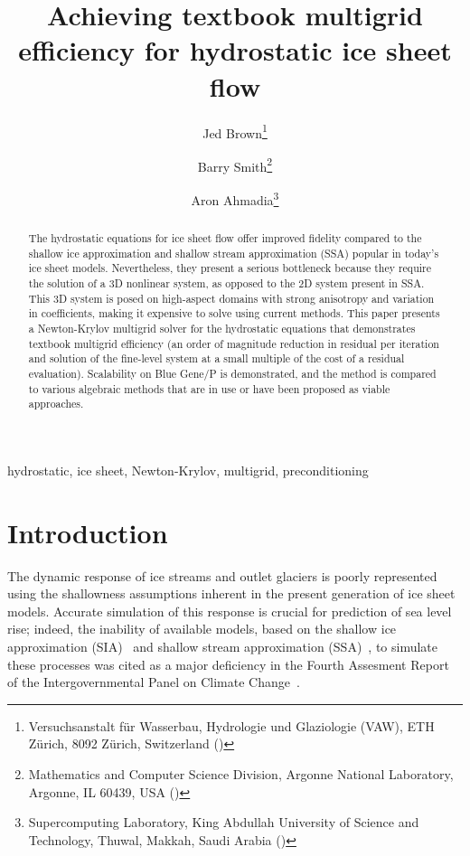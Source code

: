 \documentclass[final]{siamltex}
\title{Achieving textbook multigrid efficiency for hydrostatic ice sheet flow}
\author{%
  {Jed Brown}\thanks{Versuchsanstalt f\"ur Wasserbau, Hydrologie und Glaziologie (VAW), ETH Z\"urich, 8092 Z\"urich, Switzerland (\email{brown@vaw.baug.ethz.ch})}
  \and {Barry Smith}\thanks{Mathematics and Computer Science Division, Argonne National Laboratory, Argonne, IL 60439, USA (\email{bsmith@mcs.anl.gov})}
  \and {Aron Ahmadia}\thanks{Supercomputing Laboratory, King Abdullah University of Science and Technology, Thuwal, Makkah, Saudi Arabia (\email{aron.ahmadia@kaust.edu.sa})}}
\newcommand{\citep}[1]{{\cite{#1}}}
\begin{document}
\maketitle
\begin{abstract}
The hydrostatic equations for ice sheet flow offer improved fidelity compared to the shallow ice approximation and shallow stream approximation (SSA) popular in today's ice sheet models. Nevertheless, they present a serious bottleneck because they require the solution of a 3D nonlinear system, as opposed to the 2D system present in SSA.  This 3D system is posed on high-aspect domains with strong anisotropy and variation in coefficients, making it expensive to solve using current methods.  This paper presents a Newton-Krylov multigrid solver for the hydrostatic equations that demonstrates textbook multigrid efficiency (an order of magnitude reduction in residual per iteration and solution of the fine-level system at a small multiple of the cost of a residual evaluation).  Scalability on Blue Gene/P is demonstrated, and the method is compared to various algebraic methods that are in use or have been proposed as viable approaches.
\end{abstract}
\begin{keywords}
  hydrostatic, ice sheet, Newton-Krylov, multigrid, preconditioning
\end{keywords}
\pagestyle{myheadings}
\thispagestyle{plain}

\section{Introduction}
The dynamic response of ice streams and outlet glaciers is poorly represented using the shallowness
assumptions inherent in the present generation of ice sheet models.  Accurate simulation of this
response is crucial for prediction of sea level rise; indeed, the inability of available models, based on
the shallow ice approximation (SIA)~\citep{hutter1983tgm} and shallow stream approximation
(SSA)~\citep{morland1987unconfined,weis1999theory}, to simulate these processes was cited as a major
deficiency in the Fourth Assesment Report of the Intergovernmental Panel on Climate Change~\citep{ipcc2007ar4-syr}.
\end{document}
